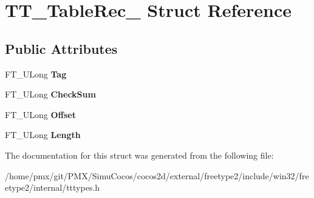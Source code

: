 \hypertarget{structTT__TableRec__}{}\section{T\+T\+\_\+\+Table\+Rec\+\_\+ Struct Reference}
\label{structTT__TableRec__}
\subsection*{Public Attributes}
\begin{DoxyCompactItemize}
\item 
\mbox{\label{structTT__TableRec___aaccaf9e9d3421fc37fa6e51875534995}} 
F\+T\+\_\+\+U\+Long {\bfseries Tag}
\item 
\mbox{\label{structTT__TableRec___aacf9207fae3522bb65359c2288900fca}} 
F\+T\+\_\+\+U\+Long {\bfseries Check\+Sum}
\item 
\mbox{\label{structTT__TableRec___a91840e1cee040f8da6a34a081dda17b6}} 
F\+T\+\_\+\+U\+Long {\bfseries Offset}
\item 
\mbox{\label{structTT__TableRec___aa0d3a1f4491bf4418bc26241bdd7d21b}} 
F\+T\+\_\+\+U\+Long {\bfseries Length}
\end{DoxyCompactItemize}


The documentation for this struct was generated from the following file\+:\begin{DoxyCompactItemize}
\item 
/home/pmx/git/\+P\+M\+X/\+Simu\+Cocos/cocos2d/external/freetype2/include/win32/freetype2/internal/tttypes.\+h\end{DoxyCompactItemize}

